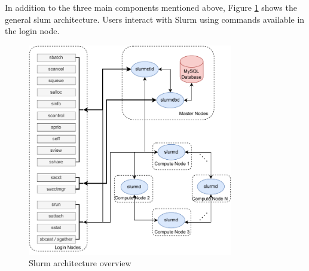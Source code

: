 In addition to the three main components mentioned above, Figure \ref{fig_slurm_overview} shows the general slum architecture. Users interact with Slurm using commands available in the login node.


\begin{figure}[H]
    \centering
    \includegraphics[width=0.8\textwidth]{figures/slurm-overview.pdf}
    \caption{Slurm architecture overview}
    \label{fig_slurm_overview}
\end{figure}


